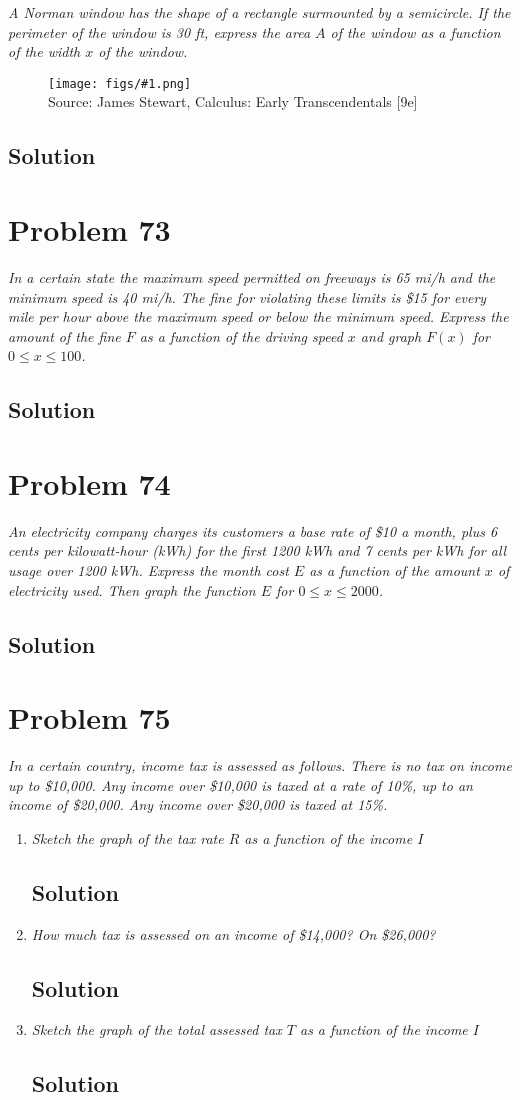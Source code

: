\documentclass[11pt]{article}
\newcommand{\soln}{\subsection*}
\newcommand{\qn}{\textit}
\newcommand{\imagesource}[1]{{\footnotesize Source: #1}}
\newcommand{\imgqn}[1]{
	\begin{figure}[h]
		\centering
		\texttt{[image: figs/\#1.png]}\\
		\imagesource{James Stewart, Calculus: Early Transcendentals [9e]}
	\end{figure}
}
\begin{document}
\qn{A Norman window has the shape of a rectangle surmounted by a semicircle. If the perimeter of the window is 30 ft, express the area $A$ of the window as a function of the width $x$ of the window.}

\imgqn{1.1.72}

\soln{Solution}

\section*{Problem 73}

\qn{In a certain state the maximum speed permitted on freeways is 65 mi/h and the minimum speed is 40 mi/h. The fine for violating these limits is \$15 for every mile per hour above the maximum speed or below the minimum speed. Express the amount of the fine $F$ as a function of the driving speed $x$ and graph $F(x)$ for $0 \le x \le 100$.}

\soln{Solution}

\section*{Problem 74}

\qn{An electricity company charges its customers a base rate of \$10 a month, plus 6 cents per kilowatt-hour (kWh) for the first 1200 kWh and 7 cents per kWh for all usage over 1200 kWh. Express the month cost $E$ as a function of the amount $x$ of electricity used. Then graph the function $E$ for $0 \le x \le 2000$.}

\soln{Solution}

\section*{Problem 75}

\qn{In a certain country, income tax is assessed as follows. There is no tax on income up to \$10,000. Any income over \$10,000 is taxed at a rate of 10\%, up to an income of \$20,000. Any income over \$20,000 is taxed at 15\%.}

\begin{enumerate}
	\item \qn{Sketch the graph of the tax rate $R$ as a function of the income $I$}
	\soln{Solution}
	
	\item \qn{How much tax is assessed on an income of \$14,000? On \$26,000?}
	\soln{Solution}
	
	\item \qn{Sketch the graph of the total assessed tax $T$ as a function of the income $I$}
	\soln{Solution}
\end{enumerate}
\end{document}

